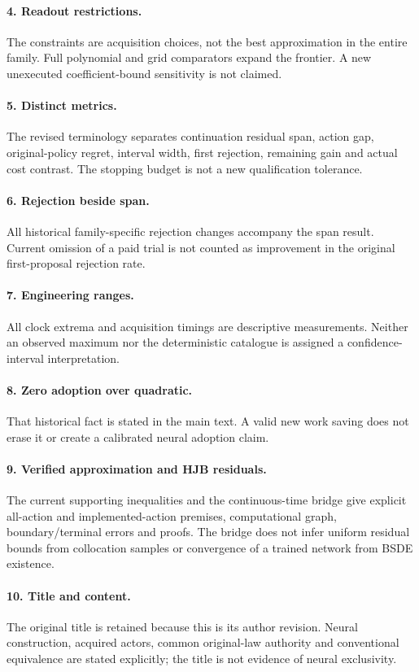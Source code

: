 \documentclass[11pt]{article}
\begin{document}
\paragraph{4. Readout restrictions.}
The constraints are acquisition choices, not the best approximation in the entire family. Full polynomial and grid comparators expand the frontier. A new unexecuted coefficient-bound sensitivity is not claimed.
\paragraph{5. Distinct metrics.}
The revised terminology separates continuation residual span, action gap, original-policy regret, interval width, first rejection, remaining gain and actual cost contrast. The stopping budget is not a new qualification tolerance.
\paragraph{6. Rejection beside span.}
All historical family-specific rejection changes accompany the span result. Current omission of a paid trial is not counted as improvement in the original first-proposal rejection rate.
\paragraph{7. Engineering ranges.}
All clock extrema and acquisition timings are descriptive measurements. Neither an observed maximum nor the deterministic catalogue is assigned a confidence-interval interpretation.
\paragraph{8. Zero adoption over quadratic.}
That historical fact is stated in the main text. A valid new work saving does not erase it or create a calibrated neural adoption claim.
\paragraph{9. Verified approximation and HJB residuals.}
The current supporting inequalities and the continuous-time bridge give explicit all-action and implemented-action premises, computational graph, boundary/terminal errors and proofs. The bridge does not infer uniform residual bounds from collocation samples or convergence of a trained network from BSDE existence.
\paragraph{10. Title and content.}
The original title is retained because this is its author revision. Neural construction, acquired actors, common original-law authority and conventional equivalence are stated explicitly; the title is not evidence of neural exclusivity.
\end{document}
